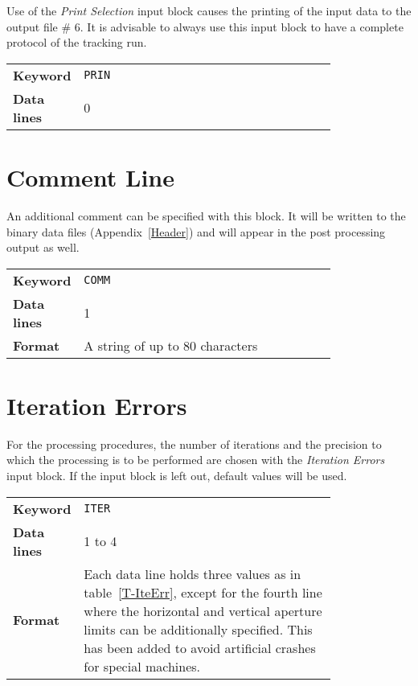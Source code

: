 Use of the \textit{Print Selection} input block causes the printing of the input data to the output file \# 6.
It is advisable to always use this input block to have a complete protocol of the tracking run.

\bigskip
\begin{tabular}{@{}lp{0.8\linewidth}}
    \textbf{Keyword}    & \texttt{PRIN} \\
    \textbf{Data lines} & 0
\end{tabular}

\section{Comment Line} \label{ComLin}

An additional comment can be specified with this block.
It will be written to the binary data files (Appendix~\ref{Header}) and will appear in the post processing output as well.

\bigskip
\begin{tabular}{@{}lp{0.8\linewidth}}
    \textbf{Keyword}    & \texttt{COMM} \\
    \textbf{Data lines} & 1 \\
    \textbf{Format}     & A string of up to 80 characters
\end{tabular}

\section{Iteration Errors} \label{IteErr}

For the processing procedures, the number of iterations and the precision to which the processing is to be performed are chosen with the \textit{Iteration Errors} input block.
If the input block is left out, default values will be used.

\bigskip
\begin{tabular}{@{}lp{0.8\linewidth}}
    \textbf{Keyword}    & \texttt{ITER} \\
    \textbf{Data lines} & 1 to 4 \\
    \textbf{Format}     & Each data line holds three values as in table~\ref{T-IteErr}, except for the fourth line where the horizontal and vertical aperture limits can be additionally specified. This has been added to avoid artificial crashes for special machines.
\end{tabular}

